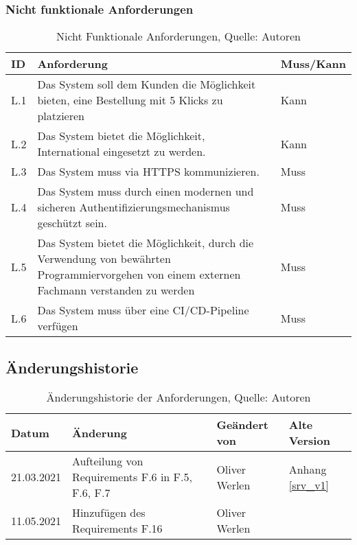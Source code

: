\subsubsection{Nicht funktionale Anforderungen}
\begin{table}[H]
	\setlength\extrarowheight{2pt} %
	\begin{tabularx}{\textwidth}{|l|X|l|}
		\hline
		\textbf{ID} &  \textbf{Anforderung} & \textbf{Muss/Kann}  \\
        \hline
		L.1 & Das System soll dem Kunden die Möglichkeit bieten, eine Bestellung mit 5 Klicks zu platzieren  & Kann \\
		\hline
		L.2 & Das System bietet die Möglichkeit, International eingesetzt zu werden. & Kann \\
		\hline
		L.3 & Das System muss via HTTPS kommunizieren. & Muss \\
		\hline
		L.4 & Das System muss durch einen modernen und sicheren Authentifizierungsmechanismus geschützt sein. & Muss \\
		\hline
		L.5 & Das System bietet die Möglichkeit, durch die Verwendung von bewährten Programmiervorgehen von einem externen Fachmann verstanden zu werden & Muss \\
		\hline
		L.6 & Das System muss über eine CI/CD-Pipeline verfügen & Muss \\
		\hline
	\end{tabularx}
	\caption{ \label{tbl: NichtFunktionaleAnforderungent}Nicht Funktionale Anforderungen, Quelle: Autoren}
\end{table}
\newpage
\subsection{Änderungshistorie}
\begin{table}[H]
	\setlength\extrarowheight{2pt} %
	\begin{tabularx}{\textwidth}{|l|X|l|X|}
		\hline
		\textbf{Datum} &  \textbf{Änderung} & \textbf{Geändert von} & \textbf{Alte Version}  \\
		\hline
		21.03.2021 & Aufteilung von Requirements F.6 in F.5, F.6, F.7  & Oliver Werlen & Anhang \ref{srv_v1}\\
		\hline
		11.05.2021 & Hinzufügen des Requirements F.16  & Oliver Werlen & \\
		\hline
	\end{tabularx}
	\caption{ \label{tbl: historieAnforderungen}Änderungshistorie der Anforderungen, Quelle: Autoren}
\end{table}
